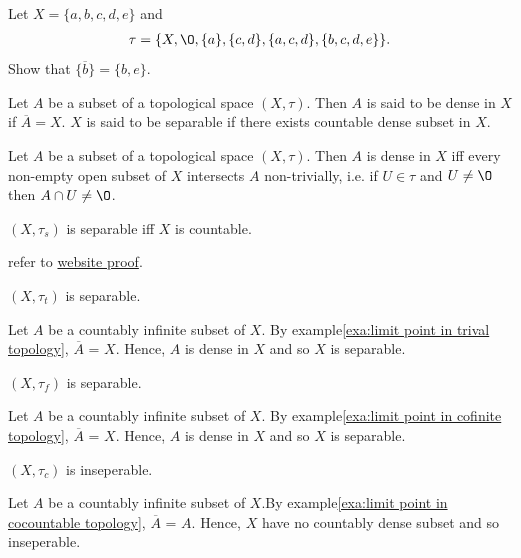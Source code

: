 \begin{example}{}{}
    Let $X=\{a,b,c,d,e\}$ and
    \begin{align*}
        \tau=\{X,\O,\{a\},\{c,d\},\{a,c,d\},\{b,c,d,e\}\}. 
    \end{align*} 
    Show that $\overline{\{b\}} = \{b,e\}$. 
\end{example}



\begin{definition}{}{}
    Let $A$ be a subset of a topological space $(X,\tau)$. Then $A$ is said to be dense in $X$ if $\overline{A}=X$.
    $X$ is said to be separable if there exists countable dense subset in $X$.
\end{definition}

\begin{proposition}{}{}
   Let $A$ be a subset of a topological space $(X,\tau)$. Then $A$ is dense in $X$ iff every non-empty open subset of $X$ intersects $A$ non-trivially, i.e.
   if $U\in \tau$ and $U\neq \O$ then $A\cap U\neq \O$. 
 \end{proposition}


\begin{example}{}{}
    $(X,\tau_s)$ is separable iff $X$ is countable. 
\end{example}
refer to \href{https://astarmathsandphysics.com/university-maths-notes/topology/2198-proof-that-a-discrete-space-is-separable-if-and-only-if-it-is-countable.html}{website proof}.


\begin{example}{}{}
    $(X,\tau_t)$ is separable. 
\end{example}
Let $A$ be a countably infinite subset of $X$. By example\ref{exa:limit point in trival topology}, 
$\overline{A}$ = $X$. Hence, $A$ is dense in $X$ and so $X$ is separable.
\begin{example}{}{}
    $(X,\tau_f)$ is separable.
\end{example}
    Let $A$ be a countably infinite subset of $X$. By example\ref{exa:limit point in cofinite topology}, 
    $\overline{A}$ = $X$. Hence, $A$ is dense in $X$ and so $X$ is separable.

\begin{example}{}{}
    $(X,\tau_c)$ is inseperable. 
\end{example}
    Let $A$ be a countably infinite subset of $X$.By example\ref{exa:limit point in cocountable topology},
    $\overline{A}$ = $A$. Hence, $X$ have no countably dense subset and so inseperable.


